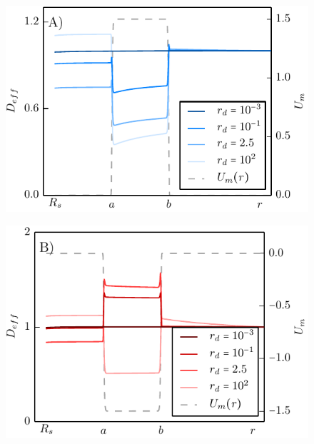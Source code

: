 \begin{minipage}[t]{.5 \textwidth}
    \begin{figure}[H]
        \includegraphics[width = 1 \textwidth]{plots/repulsive_mapping_d.pdf}
    \end{figure}
\end{minipage}\begin{minipage}[t]{.5 \textwidth}
    \begin{figure}[H]
        \includegraphics[width = 1 \textwidth]{plots/attractive_mapping_d.pdf}
    \end{figure}
\end{minipage}


